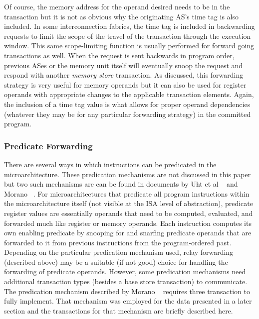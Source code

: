 \documentclass[10pt,dvips]{article}
\begin{document}
%
Of course, the memory address for the operand desired
needs to be in the transaction but it is not as obvious why
the originating AS's time tag is also included.  In some
interconnection fabrics, the time tag is included in backwarding
requests to limit the scope of the travel of the transaction
through the execution window.  This same scope-limiting function
is usually performed for forward going transactions as well.
When the request is sent backwards in program order, previous
ASes or the memory unit itself will eventually snoop
the request and respond with another \textit{memory store}
transaction.
As discussed, this forwarding strategy is very useful for memory
operands but it can also be used for register operands with
appropriate changes to the applicable transaction elements.
Again, the inclusion of a time tag value is what allows
for proper operand dependencies (whatever they may be for
any particular forwarding strategy) in the committed program.
%
\subsubsection{Predicate Forwarding}
%
There are several ways in which instructions can be predicated
in the microarchitecture.  
These predication mechanisms are not discussed in
this paper but two such mechanisms are can be found in
documents by Uht et al ~\cite{Uht01} and Morano ~\cite{Morano02}.
For microarchitectures that predicate all program instructions
within the microarchitecture itself (not visible at the ISA
level of abstraction), predicate register values are essentially
operands that need to be computed, evaluated, and forwarded
much like register or memory operands.
Each instruction computes its own enabling predicate by
snooping for and snarfing predicate operands that are forwarded
to it from previous instructions from the program-ordered past.
Depending on the particular predication mechanism used,
relay forwarding (described above) may be a suitable (if not good) choice 
for handling the forwarding of predicate operands.
However, some predication mechanisms need additional transaction
types (besides a base store transaction) to communicate.
The predication mechanism described by Morano ~\cite{Morano02}
requires three transaction to fully implement.
That mechanism was employed for the data presented in a later section
and the transactions for that mechanism
are briefly described here.
\end{document}
